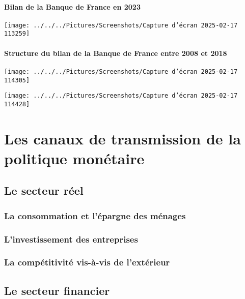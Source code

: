 \documentclass[a4paper, 12pt]{report}
\begin{document}
\subsubsection{Bilan de la Banque de France en 2023}
	
\begin{center}
	\texttt{[image: ../../../Pictures/Screenshots/Capture d'écran 2025-02-17 113259]}
\end{center}
	
\subsubsection{Structure du bilan de la Banque de France entre 2008 et 2018}

\begin{center}
	\texttt{[image: ../../../Pictures/Screenshots/Capture d'écran 2025-02-17 114305]}
\end{center}
	
\begin{center}
	\texttt{[image: ../../../Pictures/Screenshots/Capture d'écran 2025-02-17 114428]}
\end{center}
	
\chapter{Les canaux de transmission de la politique monétaire}
	
\section{Le secteur réel}
	
\subsection{La consommation et l'épargne des ménages}
	
\subsection{L'investissement des entreprises}
	
\subsection{La compétitivité vis-à-vis de l'extérieur}
	
\section{Le secteur financier}
	
\end{document}

